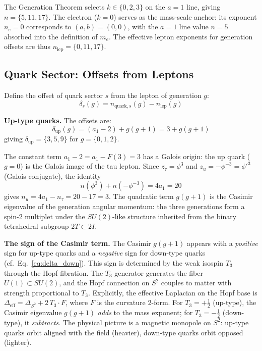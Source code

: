 \documentclass[12pt,a4paper]{article}
\theoremstyle{definition}
\begin{document}
The Generation Theorem selects $k \in \{0, 2, 3\}$ on the $a = 1$ line, giving $n = \{5, 11, 17\}$. The electron ($k = 0$) serves as the mass-scale anchor: its exponent $n_e = 0$ corresponds to $(a,b) = (0,0)$, with the $a = 1$ line value $n = 5$ absorbed into the definition of $m_e$. The effective lepton exponents for generation offsets are thus $n_{\text{lep}} = \{0, 11, 17\}$.

\subsection{Quark Sector: Offsets from Leptons}

Define the offset of quark sector $s$ from the lepton of generation $g$:
\begin{equation}
\delta_s(g) = n_{\text{quark},s}(g) - n_{\text{lep}}(g)
\end{equation}

\textbf{Up-type quarks.} The offsets are:
\begin{equation}
\boxed{\delta_{\text{up}}(g) = (a_1 - 2) + g(g+1) = 3 + g(g+1)}
\label{eq:delta_up}
\end{equation}
giving $\delta_{\text{up}} = \{3, 5, 9\}$ for $g = \{0, 1, 2\}$.

The constant term $a_1 - 2 = a_1 - F(3) = 3$ has a Galois origin: the up quark ($g = 0$) is the Galois image of the tau lepton. Since $z_\tau = \phi^3$ and $z_u = -\phi^{-3} = \phi'^3$ (Galois conjugate), the identity
\begin{equation}
n(\phi^3) + n(-\phi^{-3}) = 4a_1 = 20
\end{equation}
gives $n_u = 4a_1 - n_\tau = 20 - 17 = 3$. The quadratic term $g(g+1)$ is the Casimir eigenvalue of the generation angular momentum: the three generations form a spin-2 multiplet under the $SU(2)$-like structure inherited from the binary tetrahedral subgroup $2T \subset 2I$.

\textbf{The sign of the Casimir term.} The Casimir $g(g+1)$ appears with a \emph{positive} sign for up-type quarks and a \emph{negative} sign for down-type quarks (cf.\ Eq.~\eqref{eq:delta_down}). This sign is determined by the weak isospin $T_3$ through the Hopf fibration. The $T_3$ generator generates the fiber $U(1) \subset SU(2)$, and the Hopf connection on $S^2$ couples to matter with strength proportional to $T_3$. Explicitly, the effective Laplacian on the Hopf base is $\Delta_{\text{eff}} = \Delta_{S^2} + 2\,T_3 \cdot F$, where $F$ is the curvature 2-form. For $T_3 = +\tfrac{1}{2}$ (up-type), the Casimir eigenvalue $g(g+1)$ \emph{adds} to the mass exponent; for $T_3 = -\tfrac{1}{2}$ (down-type), it \emph{subtracts}. The physical picture is a magnetic monopole on $S^2$: up-type quarks orbit aligned with the field (heavier), down-type quarks orbit opposed (lighter).
\end{document}
